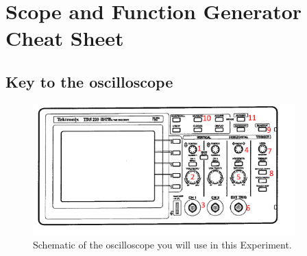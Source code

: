 \newpage

\section*{Scope and Function Generator Cheat Sheet}

\subsection*{Key to the oscilloscope}

\begin{figure}[h!]
        \centering
            \includegraphics[width=0.9\textwidth]{./Exp1-10/pic/scope_label.pdf}
        \caption{Schematic of the oscilloscope you will use in this Experiment.}
        \label{fig:osc}
\end{figure}

